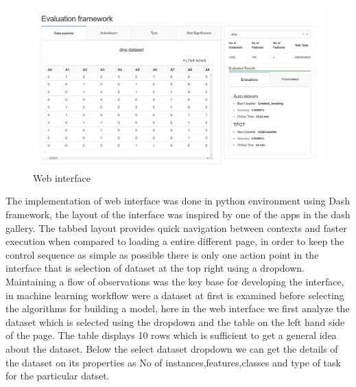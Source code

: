 \begin{figure}[!h]
    	\centering
    	\includegraphics[width=1\linewidth]{thesis_template/images/webinterface.png}
    	\caption{Web interface}
    	\label{fig:webinterface}
        \end{figure}

The implementation of web interface was done in python environment using Dash framework, the layout of the interface was inspired by one of the apps in the dash gallery. The tabbed layout provides quick navigation between contexts and faster execution when compared to loading a entire different page, in order to keep the control sequence as simple as possible there is only one action point in the interface that is selection of dataset at the top right using a dropdown.
Maintaining a flow of observations was the key base for developing the interface, in machine learning workflow were a dataset at first is examined before selecting the algorithms for building a model, here in the web interface we first analyze the dataset which is selected using the dropdown and the table on the left hand side of the page. The table displays 10 rows which is sufficient to get a general idea about the dataset. Below the select dataset dropdown we can get the details of the dataset on its properties as No of instances,features,classes and type of task for the particular datset.

